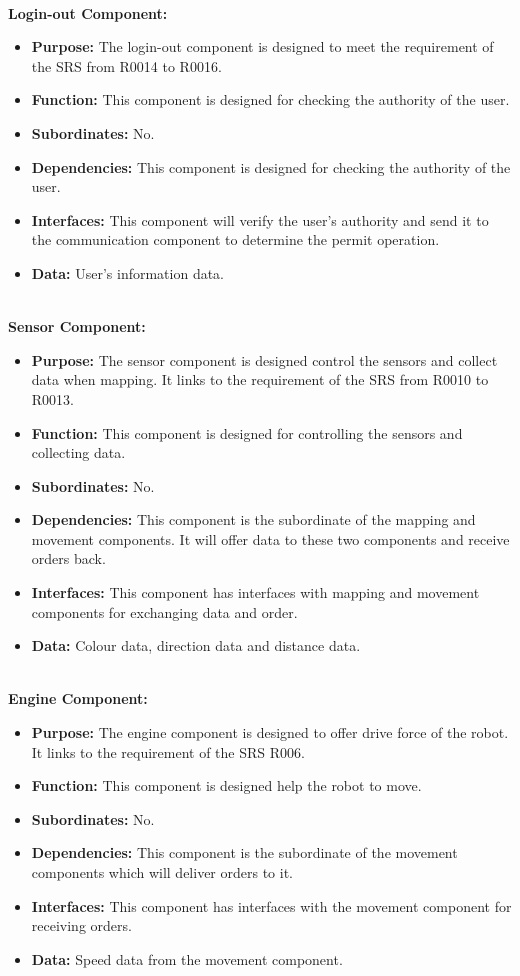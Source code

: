 \documentclass[11pt, a4paper]{article}
\begin{document}
\\
\textbf{Login-out Component:}
\begin{itemize}
\item {\bfseries Purpose: }The login-out component is designed to meet the requirement of the SRS from R0014 to R0016. 
\item {\bfseries Function: }This component is designed for checking the authority of the user.
\item {\bfseries Subordinates: }No.
\item {\bfseries Dependencies: }This component is designed for checking the authority of the user.
\item {\bfseries Interfaces: } This component will verify the user's authority and send it to the communication component to determine the permit operation.
\item {\bfseries Data: }User's information data.
\end{itemize}
\\
\textbf{Sensor Component:}
\begin{itemize}
\item {\bfseries Purpose: }The sensor component is designed control the sensors and collect data when mapping. It links to the requirement of the SRS from R0010 to R0013. 
\item {\bfseries Function: }This component is designed for controlling the sensors and collecting data.
\item {\bfseries Subordinates: }No.
\item {\bfseries Dependencies: }This component is the subordinate of the mapping and movement components. It will offer data to these two components and receive orders back.
\item {\bfseries Interfaces: }This component has interfaces with mapping and movement components for exchanging data and order.
\item {\bfseries Data: }Colour data, direction data and distance data.
\end{itemize}
\\
\textbf{Engine Component:}
\begin{itemize}
\item {\bfseries Purpose: }The engine component is designed to offer drive force of the robot. It links to the requirement of the SRS R006.
\item {\bfseries Function: }This component is designed help the robot to move.
\item {\bfseries Subordinates: }No.
\item {\bfseries Dependencies: }This component is the subordinate of the movement components which will deliver orders to it.
\item {\bfseries Interfaces: }This component has interfaces with the movement component for receiving orders.
\item {\bfseries Data: }Speed data from the movement component.
\end{itemize}
\end{document}
